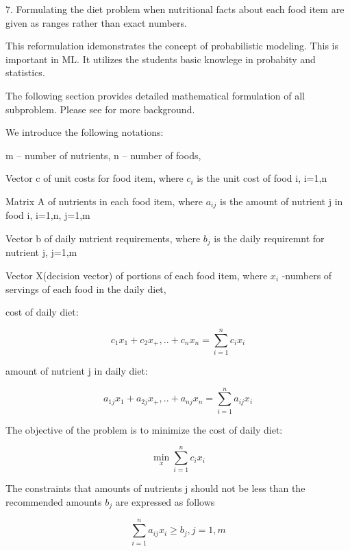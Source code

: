{{{7. Formulating the diet problem when nutritional facts about each food item are given as ranges rather than exact numbers.

This reformulation idemonstrates the concept of probabilistic modeling. This is important in ML. It utilizes the students basic knowlege in probabity and statistics.

The following section provides detailed mathematical formulation of all subproblem. Please see \cite{RV} for more background.

We introduce the following notations:

m – number of nutrients, n – number of foods, 

Vector c of unit costs for food item, where  $c_i$ is the unit cost of food i, i=1,n

Matrix A of nutrients in each food item, where  $a_{ij}$ is the amount of nutrient j in food i, i=1,n, j=1,m

Vector b  of daily nutrient requirements, where $b_j$ is the daily  requiremnt for nutrient j, j=1,m

Vector X(decision vector)  of portions of each food item, where $x_i$ -numbers of servings of each food in the daily diet, 


cost of daily diet:

    \begin{equation} %
    c_1x_1+c_2x_+,..+ c_nx_n=\sum_{i=1}^{n}{c_ix_i}
    \end{equation}

amount of nutrient j in daily diet:

    \begin{equation} %
    a_{1j}x_1+a_{2j}x_+,..+ a_{nj}x_n=\sum_{i=1}^{n}{a_{ij}x_i}
    \end{equation}

The objective of the problem is to minimize the cost of daily diet:

    \begin{equation} %
   \min_x \sum_{i=1}^{n}{c_ix_i}
    \end{equation}

The constraints that amounts of nutrients j should not be less than the recommended amounts $b_j$ are expressed as follows

   \begin{equation} %
    \sum_{i=1}^{n}{a_{ij}x_i}\ge b_j, j=1,m
    \end{equation}

}}}
